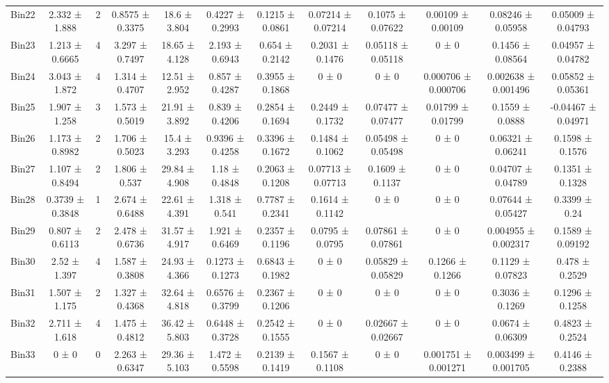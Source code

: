 \begin{tabular}{@{\extracolsep{4pt}}lccccccccccc@{}}
     Bin22 & 2.332 ± 1.888 & 2 & 0.8575 ± 0.3375 & 18.6 ± 3.804 & 0.4227 ± 0.2993 & 0.1215 ± 0.0861 & 0.07214 ± 0.07214 & 0.1075 ± 0.07622 & 0.00109 ± 0.00109 & 0.08246 ± 0.05958 & 0.05009 ± 0.04793 \\ 
     Bin23 & 1.213 ± 0.6665 & 4 & 3.297 ± 0.7497 & 18.65 ± 4.128 & 2.193 ± 0.6943 & 0.654 ± 0.2142 & 0.2031 ± 0.1476 & 0.05118 ± 0.05118 & 0 ± 0 & 0.1456 ± 0.08564 & 0.04957 ± 0.04782 \\ 
     Bin24 & 3.043 ± 1.872 & 4 & 1.314 ± 0.4707 & 12.51 ± 2.952 & 0.857 ± 0.4287 & 0.3955 ± 0.1868 & 0 ± 0 & 0 ± 0 & 0.000706 ± 0.000706 & 0.002638 ± 0.001496 & 0.05852 ± 0.05361 \\ 
     Bin25 & 1.907 ± 1.258 & 3 & 1.573 ± 0.5019 & 21.91 ± 3.892 & 0.839 ± 0.4206 & 0.2854 ± 0.1694 & 0.2449 ± 0.1732 & 0.07477 ± 0.07477 & 0.01799 ± 0.01799 & 0.1559 ± 0.0888 & -0.04467 ± 0.04971 \\ 
     Bin26 & 1.173 ± 0.8982 & 2 & 1.706 ± 0.5023 & 15.4 ± 3.293 & 0.9396 ± 0.4258 & 0.3396 ± 0.1672 & 0.1484 ± 0.1062 & 0.05498 ± 0.05498 & 0 ± 0 & 0.06321 ± 0.06241 & 0.1598 ± 0.1576 \\ 
     Bin27 & 1.107 ± 0.8494 & 2 & 1.806 ± 0.537 & 29.84 ± 4.908 & 1.18 ± 0.4848 & 0.2063 ± 0.1208 & 0.07713 ± 0.07713 & 0.1609 ± 0.1137 & 0 ± 0 & 0.04707 ± 0.04789 & 0.1351 ± 0.1328 \\ 
     Bin28 & 0.3739 ± 0.3848 & 1 & 2.674 ± 0.6488 & 22.61 ± 4.391 & 1.318 ± 0.541 & 0.7787 ± 0.2341 & 0.1614 ± 0.1142 & 0 ± 0 & 0 ± 0 & 0.07644 ± 0.05427 & 0.3399 ± 0.24 \\ 
     Bin29 & 0.807 ± 0.6113 & 2 & 2.478 ± 0.6736 & 31.57 ± 4.917 & 1.921 ± 0.6469 & 0.2357 ± 0.1196 & 0.0795 ± 0.0795 & 0.07861 ± 0.07861 & 0 ± 0 & 0.004955 ± 0.002317 & 0.1589 ± 0.09192 \\ 
     Bin30 & 2.52 ± 1.397 & 4 & 1.587 ± 0.3808 & 24.93 ± 4.366 & 0.1273 ± 0.1273 & 0.6843 ± 0.1982 & 0 ± 0 & 0.05829 ± 0.05829 & 0.1266 ± 0.1266 & 0.1129 ± 0.07823 & 0.478 ± 0.2529 \\ 
     Bin31 & 1.507 ± 1.175 & 2 & 1.327 ± 0.4368 & 32.64 ± 4.818 & 0.6576 ± 0.3799 & 0.2367 ± 0.1206 & 0 ± 0 & 0 ± 0 & 0 ± 0 & 0.3036 ± 0.1269 & 0.1296 ± 0.1258 \\ 
     Bin32 & 2.711 ± 1.618 & 4 & 1.475 ± 0.4812 & 36.42 ± 5.803 & 0.6448 ± 0.3728 & 0.2542 ± 0.1555 & 0 ± 0 & 0.02667 ± 0.02667 & 0 ± 0 & 0.0674 ± 0.06309 & 0.4823 ± 0.2524 \\ 
     Bin33 & 0 ± 0 & 0 & 2.263 ± 0.6347 & 29.36 ± 5.103 & 1.472 ± 0.5598 & 0.2139 ± 0.1419 & 0.1567 ± 0.1108 & 0 ± 0 & 0.001751 ± 0.001271 & 0.003499 ± 0.001705 & 0.4146 ± 0.2388 \\ 

\end{tabular}
